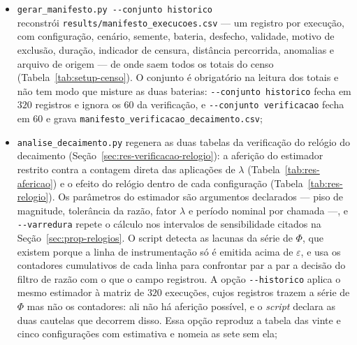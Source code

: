 \begin{itemize}
    \item \texttt{gerar\_manifesto.py -{}-conjunto historico}\\
    reconstrói \texttt{results/\allowbreak manifesto\_\allowbreak execucoes.csv} --- um
    registro por execução, com
    configuração, cenário, semente, bateria, desfecho, validade, motivo de exclusão,
    duração, indicador de censura, distância percorrida, anomalias e arquivo de origem
    --- de onde saem todos os totais do censo (Tabela~\ref{tab:setup-censo}). O
    conjunto é obrigatório na leitura dos totais e não tem modo que misture as duas
    baterias: \texttt{-{}-conjunto historico} fecha em $320$ registros e ignora os $60$
    da verificação, e \texttt{-{}-conjunto verificacao} fecha em $60$ e grava
    \texttt{manifesto\_\allowbreak verificacao\_\allowbreak decaimento.csv};
    \item \texttt{analise\_decaimento.py} regenera as duas tabelas da verificação do
    relógio do decaimento (Seção~\ref{sec:res-verificacao-relogio}): a aferição do
    estimador restrito contra a contagem direta das aplicações de $\lambda$
    (Tabela~\ref{tab:res-afericao}) e o efeito do relógio dentro de cada configuração
    (Tabela~\ref{tab:res-relogio}). Os parâmetros do estimador são argumentos
    declarados --- piso de magnitude, tolerância da razão, fator $\lambda$ e período
    nominal por chamada ---, e \texttt{-{}-varredura} repete o cálculo nos intervalos
    de sensibilidade citados na Seção~\ref{sec:prop-relogios}. O script detecta as
    lacunas da série de $\Phi$, que existem porque a linha de instrumentação só é
    emitida acima de $\varepsilon$, e usa os contadores cumulativos de cada linha para
    confrontar par a par a decisão do filtro de razão com o que o campo registrou. A opção
\texttt{-{}-historico} aplica o mesmo estimador à matriz de $320$ execuções, cujos
registros trazem a série de $\Phi$ mas não os contadores: ali não há aferição possível,
e o \textit{script} declara as duas cautelas que decorrem disso. Essa opção reproduz a
tabela das vinte e cinco configurações com estimativa e nomeia as sete sem ela;


\end{itemize}
